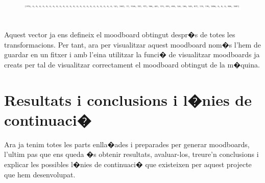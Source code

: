 \documentclass[12pt,a4paper,openright,oneside]{article}
\numberwithin{equation}{section}
\theoremstyle{definition}
\begin{document}
\begin{figure}[h!]
\begin{center}
\includegraphics[width=\textwidth]{final_vector}
\end{center}
\end{figure}
\\
Aquest vector ja ens defineix el moodboard obtingut despr�s de totes les transformacions. Per tant, ara per visualitzar aquest moodboard nom�s l'hem de guardar en un fitxer i amb l'eina utilitzar la funci� de visualitzar moodboards ja creats per tal de visualitzar correctament el moodboard obtingut de la m�quina.
\newpage
\section{Resultats i conclusions i l�nies de continuaci�}
Ara ja tenim totes les parts enlla�ades i preparades per generar moodboards, l'ultim pas que ens queda �s obtenir resultats, avaluar-los, treure'n conclusions i explicar les possibles l�nies de continuaci�  que existeixen per aquest projecte que hem desenvolupat.
\end{document}
